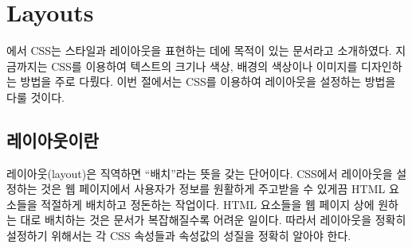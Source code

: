 \section{Layouts} \label{sect:layouts}

에서 CSS는 스타일과 레이아웃을 표현하는 데에 목적이 있는 문서라고 소개하였다. 지금까지는 CSS를 이용하여 텍스트의 크기나 색상, 배경의 색상이나 이미지를 디자인하는 방법을 주로 다뤘다. 이번 절에서는 CSS를 이용하여 레이아웃을 설정하는 방법을 다룰 것이다.

\subsection*{레이아웃이란}
레이아웃(layout)은 직역하면 ``배치''라는 뜻을 갖는 단어이다. CSS에서 레이아웃을 설정하는 것은 웹 페이지에서 사용자가 정보를 원활하게 주고받을 수 있게끔 HTML 요소들을 적절하게 배치하고 정돈하는 작업이다. HTML 요소들을 웹 페이지 상에 원하는 대로 배치하는 것은 문서가 복잡해질수록 어려운 일이다. 따라서 레이아웃을 정확히 설정하기 위해서는 각 CSS 속성들과 속성값의 성질을 정확히 알아야 한다.

